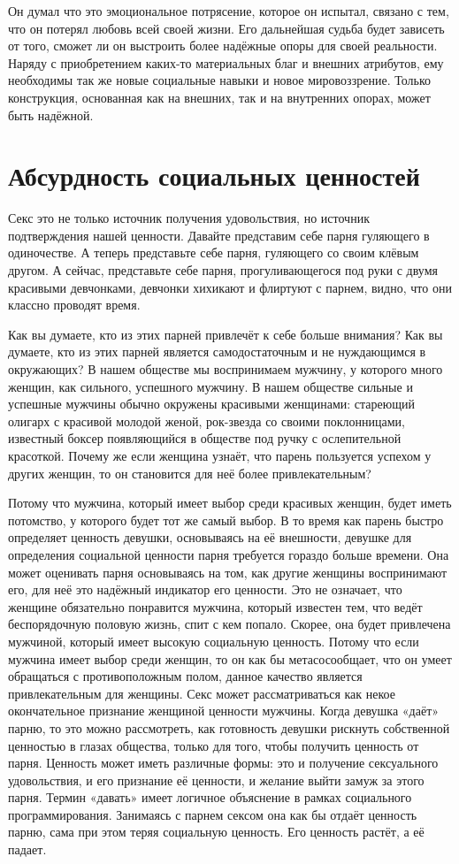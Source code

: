 Он думал что это эмоциональное потрясение, которое он испытал, связано с тем, что он потерял любовь всей своей жизни. Его дальнейшая судьба будет зависеть от того, сможет ли он выстроить более надёжные опоры для своей реальности. Наряду с приобретением каких-то материальных благ и внешних атрибутов, ему необходимы так же новые социальные навыки и новое мировоззрение. Только конструкция, основанная как на внешних, так и на внутренних опорах, может быть надёжной.
\chapter{Абсурдность социальных ценностей}

Секс это не только источник получения удовольствия, но источник подтверждения нашей ценности. Давайте представим себе парня гуляющего в одиночестве. А теперь представьте себе парня, гуляющего со своим клёвым другом. А сейчас, представьте себе парня, прогуливающегося под руки с двумя красивыми девчонками, девчонки хихикают и флиртуют с парнем, видно, что они классно проводят время.

Как вы думаете, кто из этих парней привлечёт к себе больше внимания? Как вы думаете, кто из этих парней является самодостаточным и не нуждающимся в окружающих? В нашем обществе мы воспринимаем мужчину, у которого много женщин, как сильного, успешного мужчину. В нашем обществе сильные и успешные мужчины обычно окружены красивыми женщинами: стареющий олигарх с красивой молодой женой, рок-звезда со своими поклонницами, известный боксер появляющийся в обществе под ручку с ослепительной красоткой. Почему же если женщина узнаёт, что парень пользуется успехом у других женщин, то он становится для неё более привлекательным?

Потому что мужчина, который имеет выбор среди красивых женщин, будет иметь потомство, у которого будет тот же самый выбор. В то время как парень быстро определяет ценность девушки, основываясь на её внешности, девушке для определения социальной ценности парня требуется гораздо больше времени. Она может оценивать парня основываясь на том, как другие женщины воспринимают его, для неё это надёжный индикатор его ценности. Это не означает, что женщине обязательно понравится мужчина, который известен тем, что ведёт беспорядочную половую жизнь, спит с кем попало. Скорее, она будет привлечена мужчиной, который имеет высокую социальную ценность. Потому что если мужчина имеет выбор среди женщин, то он как бы метасосообщает, что он умеет обращаться с противоположным полом, данное качество является привлекательным для женщины. Секс может рассматриваться как некое окончательное признание женщиной ценности мужчины. Когда девушка «даёт» парню, то это можно рассмотреть, как готовность девушки рискнуть собственной ценностью в глазах общества, только для того, чтобы получить ценность от парня. Ценность может иметь различные формы: это и получение сексуального удовольствия, и его признание её ценности, и желание выйти замуж за этого парня. Термин «давать» имеет логичное объяснение в рамках социального программирования. Занимаясь с парнем сексом она как бы отдаёт ценность парню, сама при этом теряя социальную ценность. Его ценность растёт, а её падает.

